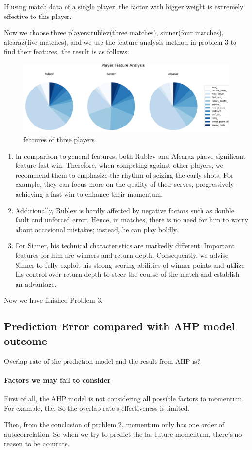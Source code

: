 If using match data of a single player, the factor with bigger weight is extremely effective to 
this player.

Now we choose three players:rublev(three matches), sinner(four matches), alcaraz(five matches), and 
we use the feature analysis method in problem 3 to find their features, the result is as follows:
\begin{figure}[H]
    \centering
    \includegraphics[scale=0.4]{mainmatter/imgs/9.png}
    \caption{features of three players}
\end{figure}
\begin{enumerate}
    \item In comparison to general features, both Rublev and Alcaraz phave significant feature fast win. 
    Therefore, when competing against other players, we recommend them to emphasize the rhythm of seizing 
    the early shots. For example, they can focus more on the quality of their serves, 
    progressively achieving a fast win to enhance their momentum. 
    \item Additionally, Rublev is hardly affected by negative factors such as double fault and 
    unforced error. Hence, in matches, there is no need for him to worry about occasional mistakes; 
    instead, he can play boldly.
    \item For Sinner, his technical characteristics are markedly different. 
    Important features for him are winners and return depth. Consequently, 
    we advise Sinner to fully exploit his strong scoring abilities of winner points
    and utilize his control over return depth to steer the course of the match and establish an advantage.

\end{enumerate}

Now we have finished Problem 3.

\subsection{Prediction Error compared with AHP model outcome}

Overlap rate of the prediction model and the result from AHP is?

\paragraph{Factors we may fail to consider}

First of all, the AHP model is not considering all possible factors to momentum.
For example, the.
So the overlap rate's effectiveness is limited.

Then, from the conclusion of problem 2, momentum only has one order of autocorrelation.
So when we try to predict the far future momentum, there's no reason to be accurate.